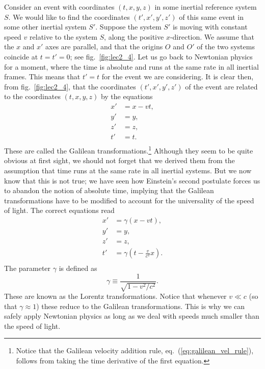 Consider an event with coordinates $(t,x,y,z)$ in some inertial reference system $S$. We would like to find the coordinates $(t',x',y',z')$ of this same event in some other inertial system $S'$. Suppose the system $S'$ is moving with constant speed $v$ relative to the system $S$, along the positive $x$-direction. We assume that the $x$ and $x'$ axes are parallel, and that the origins $O$ and $O'$ of the two systems coincide at $t=t'=0$; see fig.\ \ref{fig:lec2_4}. Let us go back to Newtonian physics for a moment, where the time is absolute and runs at the same rate in all inertial frames. This means that $t'=t$ for the event we are considering. It is clear then, from fig.\ \ref{fig:lec2_4}, that the coordinates $(t',x',y',z')$ of the event are related to the coordinates $(t,x,y,z)$ by the equations
\begin{equation}
\begin{split}
x'&=x-vt,\\
y'&=y,\\
z'&=z,\\
t'&=t.\\
\end{split}
\end{equation}
These are called the Galilean transformations.\footnote{Notice that the Galilean velocity addition rule, eq.\ (\ref{eq:galilean_vel_rule}), follows from taking the time derivative of the first equation.} Although they seem to be quite obvious at first sight, we should not forget that we derived them from the assumption that time runs at the same rate in all inertial systems. But we now know that this is not true; we have seen how Einstein's second postulate forces us to abandon the notion of absolute time, implying that the Galilean transformations have to be modified to account for the universality of the speed of light. The correct equations read
\begin{equation} \label{eq:lorentz_transf}
\begin{split}
x'&=\gamma\left(x-vt\right),\\
y'&=y,\\
z'&=z,\\
t'&=\gamma\left(t-\frac{v}{c^2}x\right).\\
\end{split}
\end{equation}
The parameter $\gamma$ is defined as
\begin{equation}
\gamma\equiv\frac{1}{\sqrt{1-v^2/c^2}}.
\end{equation}
These are known as the Lorentz transformations. Notice that whenever $v\ll c$ (so that $\gamma\approx1$) these reduce to the Galilean transformations. This is why we can safely apply Newtonian physics as long as we deal with speeds much smaller than the speed of light.
